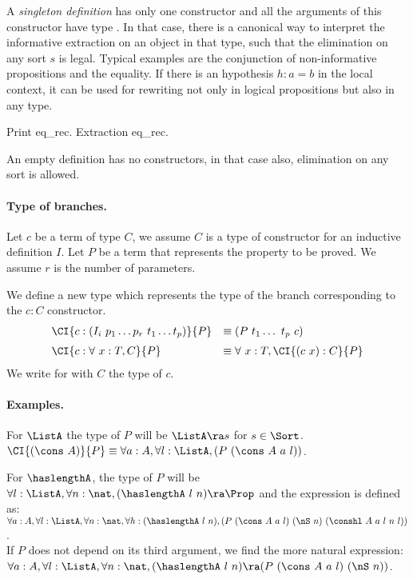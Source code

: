 
A {\em singleton
definition} has only one constructor and all the arguments of this
constructor have type \Prop. In that case, there is a canonical
way to interpret the informative extraction on an object in that type,
such that the elimination on any sort $s$ is legal.  Typical examples are
the conjunction of non-informative propositions and the equality. 
If there is an hypothesis $h:a=b$ in the local context, it can be used for
rewriting not only in logical propositions but also in any type.
\begin{coq_example}
Print eq_rec.
Extraction eq_rec.
\end{coq_example}
An empty definition has no constructors, in that case also,
elimination on any sort is allowed.

\paragraph{Type of branches.}
Let $c$ be a term of type $C$, we assume $C$ is a type of constructor
for an inductive definition $I$. Let $P$ be a term that represents the
property to be proved.
We assume $r$ is the number of parameters.

We define a new type  which represents the type of the
branch corresponding to the $c:C$ constructor.
\[
\begin{array}{ll}
\CI{c:(I_i~p_1\ldots p_r\ t_1 \ldots t_p)}{P} &\equiv (P~t_1\ldots ~t_p~c) \\[2mm]
\CI{c:\forall~x:T,C}{P} &\equiv \forall~x:T,\CI{(c~x):C}{P} 
\end{array}
\]
We write  for  with $C$ the type of $c$.

\paragraph{Examples.}
For $\ListA$ the type of $P$ will be $\ListA\ra s$ for $s \in \Sort$. \\ 
$ \CI{(\cons~A)}{P} \equiv
\forall a:A, \forall l:\ListA,(P~(\cons~A~a~l))$.

For $\haslengthA$, the type of $P$ will be
$\forall l:\ListA,\forall n:\nat, (\haslengthA~l~n)\ra \Prop$ and the expression
 is defined as:\\ 
$\forall a:A, \forall l:\ListA, \forall n:\nat, \forall
h:(\haslengthA~l~n), (P~(\cons~A~a~l)~(\nS~n)~(\conshl~A~a~l~n~l))$.\\ 
If $P$ does not depend on its third argument, we find the more natural
expression:\\ 
$\forall a:A, \forall l:\ListA, \forall n:\nat,
(\haslengthA~l~n)\ra(P~(\cons~A~a~l)~(\nS~n))$.

